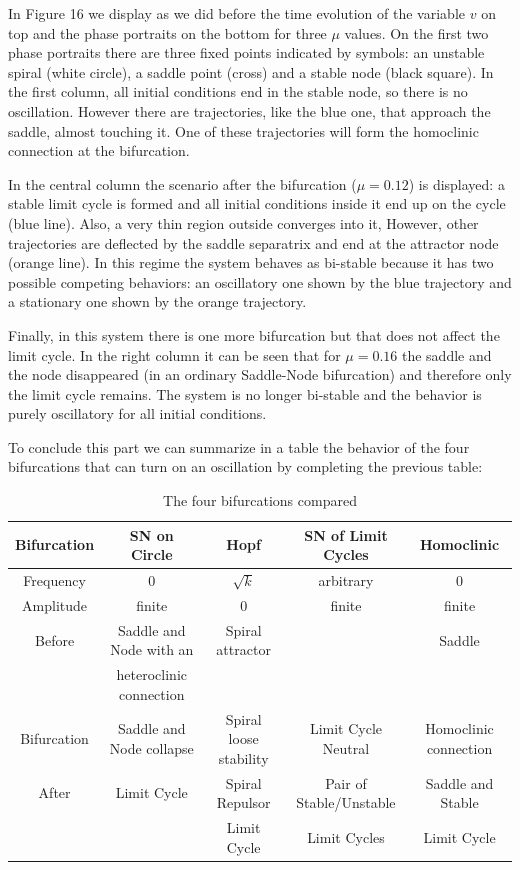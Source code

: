 \documentclass{article}
\begin{document}
In Figure 16 we display as we did before the time evolution of the variable $v$ on top and the phase portraits on the bottom for three $\mu$ values. 
On the first two phase portraits there are three fixed points indicated by symbols: an unstable spiral (white circle), a saddle point (cross) and a stable node (black square). 
In the first column, all initial conditions end in the stable node, so there is no oscillation. 
However there are trajectories, like the blue one, that approach the saddle, almost touching it. 
One of these trajectories will form the homoclinic connection at the bifurcation. 




In the central column the scenario after the bifurcation ($\mu=0.12$) is displayed: a stable limit cycle is formed and all initial conditions inside it end up on the cycle (blue line). 
Also, a very thin region outside converges into it, 
However, other trajectories are deflected by the saddle separatrix and end at the attractor node (orange line). 
In this regime the system behaves as bi-stable because it has two possible competing behaviors: an oscillatory one shown by the blue trajectory and a stationary one shown by the orange trajectory.

Finally, in this system there is one more bifurcation but that does not affect the limit cycle. 
In the right column it can be seen that for $\mu=0.16$ the saddle and the node disappeared (in an ordinary Saddle-Node bifurcation) and therefore only the limit cycle remains. 
The system is no longer bi-stable and the behavior is purely oscillatory for all initial conditions.

To conclude this part we can summarize in a table the behavior of the four bifurcations that can turn on an oscillation by completing the previous table:

\begin{table}[h!]
\begin{center}
\begin{tabular}{ |c|c|c|c|c| }
 \hline
 Bifurcation & SN on Circle & Hopf & SN of Limit Cycles & Homoclinic\\ 
 \hline
 \hline
 Frequency & 0 &  $\sqrt{k}$ & arbitrary & 0\\
 \hline
 Amplitude & finite & 0 & finite & finite \\ 
 \hline
 Before & Saddle and Node with an & Spiral attractor & & Saddle\\ 
 & heteroclinic connection & & &\\
 \hline
 Bifurcation & Saddle and Node collapse & Spiral loose stability & Limit Cycle Neutral & Homoclinic connection\\ 
 \hline
 After & Limit Cycle & Spiral Repulsor & Pair of Stable/Unstable & Saddle and Stable\\
 & & Limit Cycle & Limit Cycles & Limit Cycle\\
 \hline
\end{tabular}
\caption{The four bifurcations compared}
\end{center}
\end{table}
\end{document}
